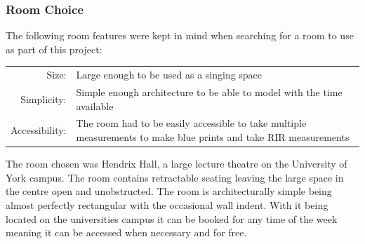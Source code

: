 \documentclass[../../main.tex]{subfiles}
\begin{document}
		\subsubsection{Room Choice}

			The following room features were kept in mind when searching for a room to use as part of this project:

			\begin{center}
			\begin{tabular}{r p{12cm}}
				Size: & Large enough to be used as a singing space \\
				Simplicity: & Simple enough architecture to be able to model with the time available \\
				Accessibility: & The room had to be easily accessible to take  multiple measurements to make blue prints and take \ac{RIR} measurements
			\end{tabular}
			\end{center}

			The room chosen was Hendrix Hall, a large lecture theatre on the University of York campus. The room contains retractable seating leaving the large space in the centre open and unobstructed. The room is architecturally simple being almost perfectly rectangular with the occasional wall indent. With it being located on the universities campus it can be booked for any time of the week meaning it can be accessed when necessary and for free.
\end{document}
